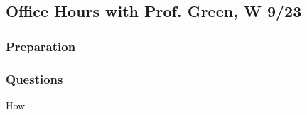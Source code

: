\subsection{Office Hours with Prof. Green, W 9/23}

\subsubsection{Preparation}



\subsubsection{Questions}

\begin{outline}
    \1 How
\end{outline}